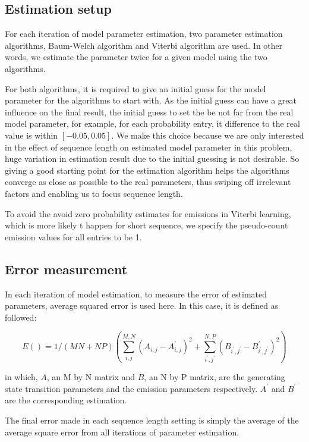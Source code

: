 \documentclass[paper=a4, fontsize=11pt]{scrartcl} %
\numberwithin{equation}{section} %
\numberwithin{figure}{section} %
\numberwithin{table}{section} %
\begin{document}
\subsection {Estimation setup}

For each iteration of model parameter estimation, two parameter estimation algorithms, Baum-Welch algorithm and Viterbi algorithm are used. In other words, we estimate the parameter twice for a given model using the two algorithms.

For both algorithms, it is required to give an initial guess for the model parameter for the algorithms to start with. As the initial guess can have a great influence on the final result, the initial guess to set the be not far from the real model parameter, for example, for each probability entry, it difference to the real value is within $[-0.05, 0.05]$. We make this choice because we are only interested in the effect of sequence length on estimated model parameter in this problem, huge variation in estimation result due to the initial guessing is not desirable. So  giving a good starting point for the estimation algorithm helps the algorithms converge as close as possible to the real parameters, thus swiping off irrelevant factors and enabling us to focus sequence length.

To avoid the avoid zero probability estimates for emissions in Viterbi learning, which is more likely t happen for short sequence, we specify the pseudo-count emission values for all entries to be 1.

\subsection {Error measurement}
In each iteration of model estimation, to measure the error of estimated parameters, average squared error is used here. In this case, it is defined as followed:

\[ E () = 1 / (M N + N P) (\sum\limits_{i,j}^{M,N} (A_{i,j} - A^{'}_{i,j})^{2} + \sum\limits_{i^{'},j^{'}}^{N,P} (B_{i^{'},j^{'}} - B^{'}_{i^{'},j^{'}})^{2})\]

in which, $A$, an M by N matrix and $B$, an N by P matrix, are the generating  state transition parameters and the emission parameters respectively.  $A^{'}$  and $B^{'}$ are the corresponding estimation.

The final error made in each sequence length setting is simply the average of the average square error from all iterations of parameter estimation.
\end{document}
